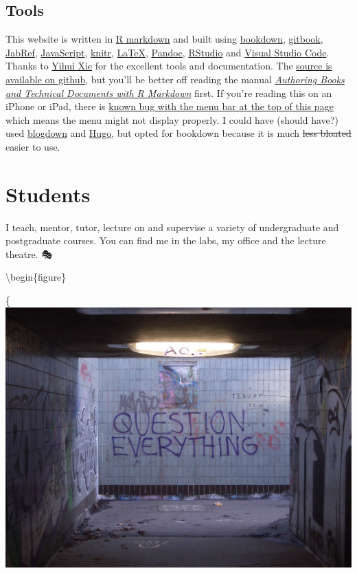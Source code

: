 \documentclass[12pt,]{book}
\begin{document}
\hypertarget{tools}{%
\section*{Tools}\label{tools}}

This website is written in \href{https://rmarkdown.rstudio.com/}{R markdown} and built using \href{https://bookdown.org}{bookdown}, \href{https://www.gitbook.com}{gitbook}, \href{http://www.jabref.org/}{JabRef}, \href{https://en.wikipedia.org/wiki/JavaScript}{JavaScript}, \href{https://en.wikipedia.org/wiki/Knitr}{knitr}, \href{https://en.wikipedia.org/wiki/LaTeX}{LaTeX}, \href{https://pandoc.org/}{Pandoc}, \href{https://www.rstudio.com/}{RStudio} and \href{https://code.visualstudio.com/}{Visual Studio Code}. Thanks to \href{https://yihui.name/}{Yihui Xie} for the excellent tools and documentation. The \href{https://github.com/dullhunk/hulled}{source is available on github}, but you'll be better off reading the manual \emph{\href{https://bookdown.org/yihui/bookdown/}{Authoring Books and Technical Documents with R Markdown}} first. If you're reading this on an iPhone or iPad, there is \href{https://github.com/rstudio/bookdown/issues/60}{known bug with the menu bar at the top of this page} which means the menu might not display properly. I could have (should have?) used \href{https://bookdown.org/yihui/blogdown/}{blogdown} and \href{https://gohugo.io}{Hugo}, but opted for bookdown because it is much \sout{less bloated} easier to use. 🔨

\hypertarget{teaching}{%
\chapter{Students}\label{teaching}}

I teach, mentor, tutor, lecture on and supervise a variety of undergraduate and postgraduate courses. You can find me in the labs, my office and the lecture theatre. 🎭

\textbackslash{}begin\{figure\}

\{\centering \includegraphics[width=0.75\linewidth]{images/question-everything}
\end{document}

